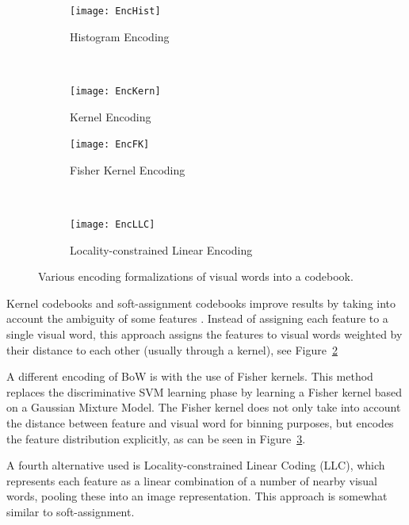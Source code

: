 \begin{figure}
    \centering
    \begin{subfigure}[b]{0.45\textwidth}
        \centering
        \texttt{[image: EncHist]}
        \caption{Histogram Encoding}
        \label{fig:enchist}
    \end{subfigure}
    ~
    \begin{subfigure}[b]{0.45\textwidth}
        \centering
        \texttt{[image: EncKern]}
        \caption{Kernel Encoding}
        \label{fig:enckern}
    \end{subfigure}
    
    \begin{subfigure}[b]{0.45\textwidth}
        \centering
        \texttt{[image: EncFK]}
        \caption{Fisher Kernel Encoding}
        \label{fig:encfk}
    \end{subfigure}
    ~
    \begin{subfigure}[b]{0.45\textwidth}
        \centering
        \texttt{[image: EncLLC]}
        \caption{Locality-constrained Linear Encoding}
        \label{fig:encllc}
    \end{subfigure}
    
    \caption{Various encoding formalizations of visual words into a codebook.}
    \label{fig:bowencoding}
\end{figure}

Kernel codebooks and soft-assignment codebooks improve results by taking into account the ambiguity of some features \cite{liu2011defense, van2010visual}. Instead of assigning each feature to a single visual word, this approach assigns the features to visual words weighted by their distance to each other (usually through a kernel), see Figure~\ref{fig:enckern}

A different encoding of BoW is with the use of Fisher kernels. \cite{perronnin2010improving} This method replaces the discriminative SVM learning phase by learning a Fisher kernel based on a Gaussian Mixture Model. The Fisher kernel does not only take into account the distance between feature and visual word for binning purposes, but encodes the feature distribution explicitly, as can be seen in Figure~\ref{fig:encfk}.

A fourth alternative used is Locality-constrained Linear Coding (LLC), \cite{wang2010locality} which represents each feature as a linear combination of a number of nearby visual words, pooling these into an image representation. This approach is somewhat similar to soft-assignment.\\

